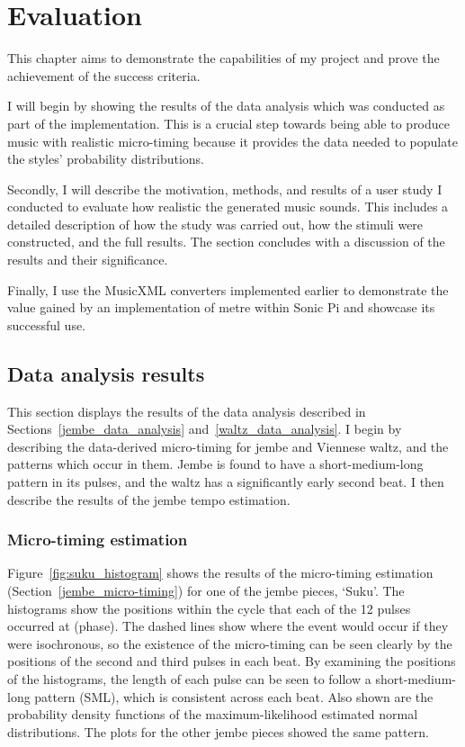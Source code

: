 \documentclass[12pt,twoside,openright]{report}
\begin{document}
\chapter{Evaluation} \label{evaluation}

This chapter aims to demonstrate the capabilities of my project and prove the
achievement of the success criteria.

I will begin by showing the results of the
data analysis which was conducted as part of the implementation. This is a
crucial step towards being able to produce music with realistic micro-timing
because it provides the data needed to populate the styles' probability
distributions.

Secondly, I will describe the motivation, methods, and results of
a user study I conducted to evaluate how realistic the generated music sounds.
This includes a detailed description of how the study was carried out, how the
stimuli were constructed, and the full results. The section concludes with a
discussion of the results and their significance.

Finally, I use the MusicXML
converters implemented earlier to demonstrate the value gained by an
implementation of metre within Sonic Pi and showcase its successful use.



\section{Data analysis results} \label{data_analysis_results}

This section displays the results of the data analysis described in Sections~\ref{jembe_data_analysis} and~\ref{waltz_data_analysis}. I
begin by describing the data-derived micro-timing for jembe and Viennese waltz,
and the patterns which occur in them. Jembe is found to have a short-medium-long
pattern in its pulses, and the waltz has a significantly early second beat. I
then describe the results of the jembe tempo estimation.


\subsection{Micro-timing estimation} \label{micro-timing_estimation_results}

Figure~\ref{fig:suku_histogram} shows the results of the micro-timing estimation (Section~\ref{jembe_micro-timing}) for one of
the jembe pieces, `Suku'. The histograms show the positions within the cycle
that each of the 12 pulses occurred at (phase). The dashed lines show where the
event would occur if they were isochronous, so the existence of the micro-timing
can be seen clearly by the positions of the second and third pulses in each beat.
By examining the positions of the histograms, the length of each pulse can be
seen to follow a short-medium-long pattern (SML), which is consistent across
each beat. Also shown are the probability density functions of the
maximum-likelihood estimated normal distributions. The plots for
the other jembe pieces showed the same pattern.
\end{document}
